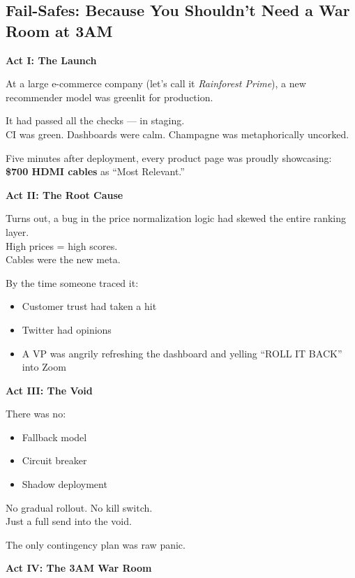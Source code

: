 \subsection{Fail-Safes: Because You Shouldn’t Need a War Room at 3AM}

\textbf{Act I: The Launch}

At a large e-commerce company (let’s call it \textit{Rainforest Prime}), a new recommender model was greenlit for production.

It had passed all the checks — in staging.\\
CI was green. Dashboards were calm. Champagne was metaphorically uncorked.

Five minutes after deployment, every product page was proudly showcasing:\\
\textbf{\$700 HDMI cables} as “Most Relevant.”

\vspace{1em}
\textbf{Act II: The Root Cause}

Turns out, a bug in the price normalization logic had skewed the entire ranking layer.\\
High prices = high scores.\\
Cables were the new meta.

By the time someone traced it:
\begin{itemize}
    \item Customer trust had taken a hit
    \item Twitter had opinions
    \item A VP was angrily refreshing the dashboard and yelling “\textsc{ROLL IT BACK}” into Zoom
\end{itemize}

\vspace{1em}
\textbf{Act III: The Void}

There was no:
\begin{itemize}
    \item Fallback model
    \item Circuit breaker
    \item Shadow deployment
\end{itemize}

No gradual rollout. No kill switch.\\
Just a full send into the void.

The only contingency plan was raw panic.

\vspace{1em}
\textbf{Act IV: The 3AM War Room}

